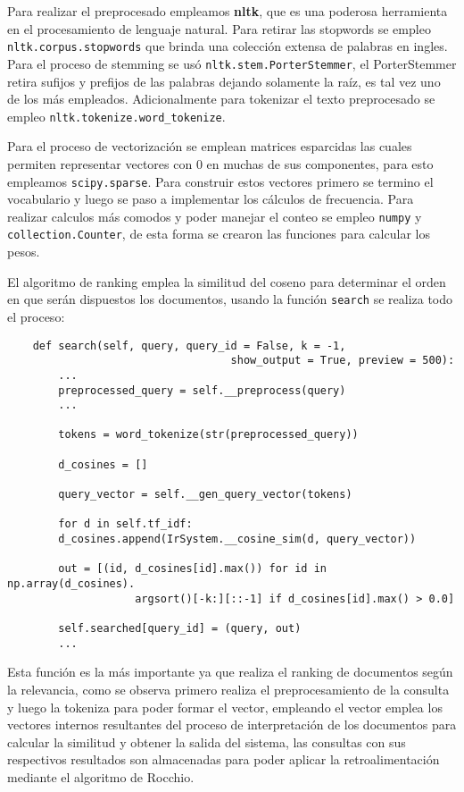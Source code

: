 \documentclass[runningheads,a4paper]{llncs}
\begin{document}
Para realizar el preprocesado empleamos \textbf{nltk}, que es una poderosa herramienta en el procesamiento de lenguaje natural. Para retirar las stopwords se empleo \verb*|nltk.corpus.stopwords| que brinda una colección extensa de palabras en ingles. Para el proceso de stemming se usó \verb*|nltk.stem.PorterStemmer|, el PorterStemmer retira sufijos y prefijos de las palabras dejando solamente la raíz, es tal vez uno de los más empleados. Adicionalmente para tokenizar el texto preprocesado se empleo \verb*|nltk.tokenize.word_tokenize|.

Para el proceso de vectorización se emplean matrices esparcidas las cuales permiten representar vectores con 0 en muchas de sus componentes, para esto empleamos \verb*|scipy.sparse|. Para construir estos vectores primero se termino el vocabulario y luego se paso a implementar los cálculos de frecuencia. Para realizar calculos más comodos y poder manejar el conteo se empleo \verb*|numpy| y \verb*|collection.Counter|, de esta forma se crearon las funciones para calcular los pesos.

El algoritmo de ranking emplea la similitud del coseno para determinar el orden en que serán dispuestos los documentos, usando la función \verb*|search| se realiza todo el proceso:

\noindent
%
\begin{verbatim}
	def search(self, query, query_id = False, k = -1, 
	                               show_output = True, preview = 500):
	    ...
	    preprocessed_query = self.__preprocess(query)
	    ...
	    
	    tokens = word_tokenize(str(preprocessed_query))
	    
	    d_cosines = []
	    
	    query_vector = self.__gen_query_vector(tokens)
	    
	    for d in self.tf_idf:
	    d_cosines.append(IrSystem.__cosine_sim(d, query_vector))
	    
	    out = [(id, d_cosines[id].max()) for id in np.array(d_cosines).
	                argsort()[-k:][::-1] if d_cosines[id].max() > 0.0]
	    
	    self.searched[query_id] = (query, out)
	    ...
\end{verbatim}
%
\noindent

Esta función es la más importante ya que realiza el ranking de documentos según la relevancia, como se observa primero realiza el preprocesamiento de la consulta y luego la tokeniza para poder formar el vector, empleando el vector emplea los vectores internos resultantes del proceso de interpretación de los documentos para calcular la similitud y obtener la salida del sistema, las consultas con sus respectivos resultados son almacenadas para poder aplicar la retroalimentación mediante el algoritmo de Rocchio.
\end{document}
